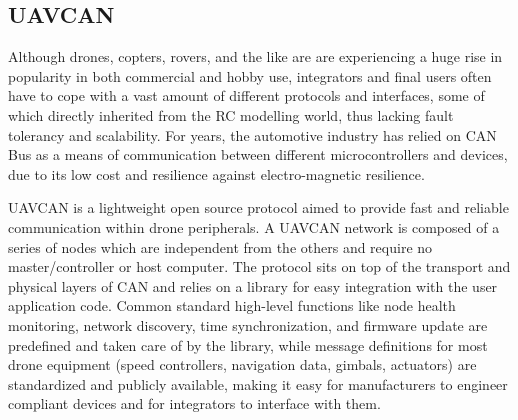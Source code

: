 \subsection{UAVCAN}

Although drones, copters, rovers, and the like are are experiencing a huge rise in popularity in both commercial and hobby use, integrators and final users often have to cope with a vast amount of different protocols and interfaces, some of which directly inherited from the RC modelling world, thus lacking fault tolerancy and scalability.
For years, the automotive industry has relied on CAN Bus as a means of communication between different microcontrollers and devices, due to its low cost and resilience against electro-magnetic resilience.

UAVCAN is a lightweight open source protocol aimed to provide fast and reliable communication within drone peripherals. \cite{joost}
A UAVCAN network is composed of a series of nodes which are independent from the others and require no master/controller or host computer.
The protocol sits on top of the transport and physical layers of CAN and relies on a library for easy integration with the user application code. 
Common standard high-level functions like node health monitoring, network discovery, time synchronization, and firmware update are predefined and taken care of by the library, while  message definitions for most drone equipment (speed controllers, navigation data, gimbals, actuators) are standardized and publicly available, making it easy for manufacturers to engineer compliant devices and for integrators to interface with them.



